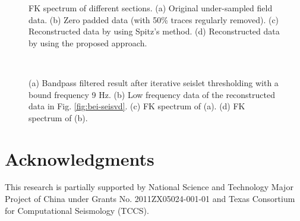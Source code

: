 \begin{figure*}[ht!]
  \centering
	\caption{FK spectrum of different sections. (a) Original under-sampled field data. (b) Zero padded data (with 50\% traces regularly removed). (c) Reconstructed data by using Spitz's method. (d) Reconstructed data by using the proposed approach.  }
   \label{fig:fk-bei,fk-bei-zero,fk-bei-fx,fk-bei-seisvd}
\end{figure*}


\begin{figure}[htb!]
  \centering
  \\
	\caption{(a) Bandpass filtered result after iterative seislet thresholding with a bound frequency 9 Hz. (b) Low frequency data of the reconstructed data in Fig. \ref{fig:bei-seisvd}. (c) FK spectrum of (a). (d) FK spectrum of (b).  }
   \label{fig:bei-seis-bp,bei-dif-bp,fk-bei-seis-bp,fk-dif-bp}
\end{figure}

\section{Acknowledgments}
This research is partially supported by National Science and Technology Major Project of China under Grants No. 2011ZX05024-001-01 and Texas Consortium for Computational Seismology (TCCS). %










